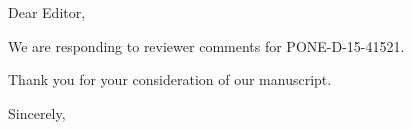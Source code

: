 \documentclass[12pt]{letterhead_stat}
\begin{document}
\signature{\vspace{-2em}\hspace{-.3cm}\texttt{[image: goodSignature.jpg]}\\Christopher Paciorek\\Associate Research Statistician\\Department of Statistics\\University of California, Berkeley}
\begin{letter}{\mbox{}}
\opening{Dear Editor,}

We are responding to reviewer comments for PONE-D-15-41521. 

Thank you for your consideration of our manuscript.

\closing{Sincerely,}
\end{letter}
\end{document}
